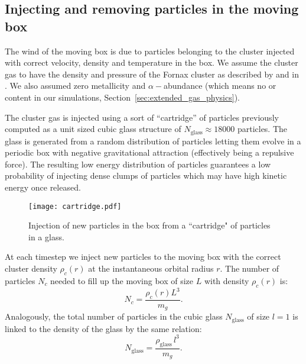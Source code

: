 \subsection{Injecting and removing particles in the moving box}
The wind of the moving box is due to particles belonging to the cluster injected with correct velocity, density and temperature in the box.
We assume the cluster gas to have the density and pressure of the Fornax cluster as described by \citet{Paolillo2002} and in .
We also assumed zero metallicity and $\alpha-$abundance (which means no \Fe{} or \Mg{} content in our simulations, \cf{} Section~\ref{sec:extended_gas_physics}).

The cluster gas is injected using a sort of ``cartridge'' of particles previously computed as a unit sized cubic glass structure of $N_{\text{glass}} \approx 18000$ particles.
The glass is generated from a random distribution of particles letting them evolve in a periodic box with negative gravitational attraction (effectively being a repulsive force).
The resulting low energy distribution of particles guarantees a low probability of injecting dense clumps of particles which may have high kinetic energy once released.

\begin{figure}
  \centering
  \texttt{[image: cartridge.pdf]}
  \caption{Injection of new particles in the box from a ``cartridge" of particles in a glass.}
  \label{fig:cartridge}
\end{figure}

At each timestep we inject new particles to the moving box with the correct cluster density $\rho_c(r)$ at the instantaneous orbital radius $r$.
The number of particles $N_c$ needed to fill up the moving box of size $L$ with density $\rho_c(r)$ is:
\begin{equation}
 N_c = \dfrac{\rho_c(r) L^3}{m_g}.
\end{equation}
Analogously, the total number of particles in the cubic glass $N_{\text{glass}}$ of size $l=1$ is linked to the density of the glass by the same relation:
\begin{equation}
  N_{\text{glass}} = \dfrac{\rho_\text{glass}\,l^3}{m_g}.
  \label{eq:N_glass}
\end{equation}

